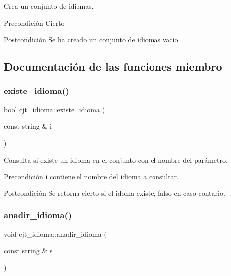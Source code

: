 Crea un conjunto de idiomas. 

\begin{DoxyPrecond}{Precondición}
Cierto 
\end{DoxyPrecond}
\begin{DoxyPostcond}{Postcondición}
Se ha creado un conjunto de idiomas vacio. 
\end{DoxyPostcond}


\subsection{Documentación de las funciones miembro}
\mbox{\label{classcjt__idioma_a253fbf0732efc679dea434ee7d261ffa}} 
\subsubsection{\texorpdfstring{existe\+\_\+idioma()}{existe\_idioma()}}
{\footnotesize\ttfamily bool cjt\+\_\+idioma\+::existe\+\_\+idioma (\begin{DoxyParamCaption}\item[{const string \&}]{i }\end{DoxyParamCaption})}



Consulta si existe un idioma en el conjunto con el nombre del parámetro. 

\begin{DoxyPrecond}{Precondición}
i contiene el nombre del idioma a consultar. 
\end{DoxyPrecond}
\begin{DoxyPostcond}{Postcondición}
Se retorna cierto si el idoma existe, falso en caso contario. 
\end{DoxyPostcond}
\mbox{\label{classcjt__idioma_aaf8acea2625eb1a72fbeaed23357c4ad}} 
\subsubsection{\texorpdfstring{anadir\+\_\+idioma()}{anadir\_idioma()}}
{\footnotesize\ttfamily void cjt\+\_\+idioma\+::anadir\+\_\+idioma (\begin{DoxyParamCaption}\item[{const string \&}]{s }\end{DoxyParamCaption})}




